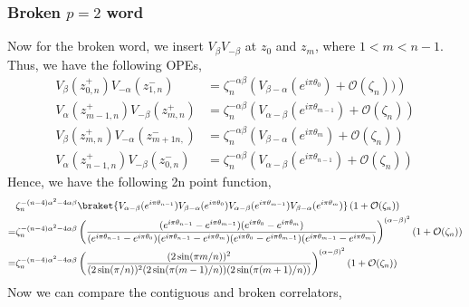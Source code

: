 \documentclass[11pt]{article}
\newcommand{\mO}{\mathcal{O}}
\newcommand{\lb}{\left(}
\newcommand{\rb}{\right)}
\begin{document}
\subsubsection{\texorpdfstring{Broken $p=2$ word}{Broken p=2 word}}
Now for the broken word, we insert $V_\beta V_{-\beta}$ at $z_0$ and $z_m$, where $1<m<n-1$. Thus, we have the following OPEs,
\begin{align}
    V_\beta(z_{0,n}^+) V_{-\alpha}(z_{1,n}^-) &= \zeta_n^{-\alpha \beta}\lb V_{\beta - \alpha}(e^{i\pi\theta_0}) + \mO(\zeta_n))\rb \\
    V_{\alpha}(z_{m-1,n}^+) V_{-\beta}(z_{m,n}^+) &= \zeta_n^{-\alpha\beta} \lb V_{\alpha -\beta}(e^{i\pi\theta_{m-1}}) + \mO(\zeta_n) \rb \\
    V_\beta(z_{m,n}^+)V_{-\alpha}(z_{m+1n,}^-) &= \zeta_n^{-\alpha\beta} \lb V_{\beta - \alpha}(e^{i\pi \theta_{m}})+ \mO(\zeta_n)\rb \\
    V_\alpha(z_{n-1,n}^+)V_{-\beta}(z_{0,n}^-) &= \zeta_n^{-\alpha\beta} \lb V_{\alpha - \beta}(e^{i\pi \theta_{n-1}})+ \mO(\zeta_n)\rb 
\end{align}
Hence, we have the following 2n point function,
\begin{align}
    &\zeta_n^{-(n-4)\alpha^2 -4\alpha\beta} \braket{V_{\alpha - \beta}(e^{i\pi \theta_{n-1}})V_{\beta - \alpha}(e^{i\pi\theta_0})V_{\alpha -\beta}(e^{i\pi\theta_{m-1}})V_{\beta - \alpha}(e^{i\pi \theta_{m}})}\lb 1+ \mO(\zeta_n)\rb \\
    =& \zeta_n^{-(n-4)\alpha^2 -4\alpha\beta} \lb\frac{(e^{i\pi\theta_{n-1}} - e^{i\pi\theta_{m-1}})(e^{i\pi\theta_{0}} - e^{i\pi\theta_{m}})}{(e^{i\pi\theta_{n-1}} - e^{i\pi\theta_{0}})(e^{i\pi\theta_{n-1}} - e^{i\pi\theta_{m}})(e^{i\pi\theta_{0}} - e^{i\pi\theta_{m-1}})(e^{i\pi\theta_{m-1}} - e^{i\pi\theta_{m}})}\rb^{(\alpha - \beta)^2} \lb 1 + \mO(\zeta_n)\rb \\
    =&\zeta_n^{-(n-4)\alpha^2 -4\alpha\beta}\lb\frac{(2\sin(\pi m /n))^2}{(2\sin(\pi/n))^2(2\sin(\pi(m-1)/n))(2\sin(\pi (m+1)/n))}\rb^{(\alpha - \beta)^2}  \lb 1 + \mO(\zeta_n)\rb 
\end{align}
Now we can compare the contiguous and broken correlators,
\end{document}
